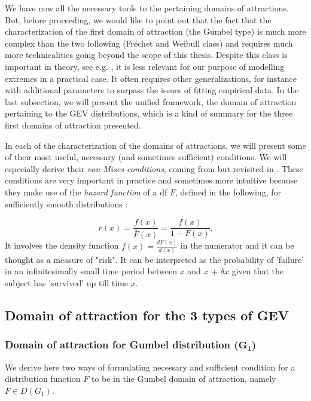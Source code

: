 \documentclass[11pt,a4paper,openany ]{book}
\begin{document}
We have now all the necessary tools to  the pertaining domains of attractions. But, before proceeding, we would like to point out that the fact that the characterization of the first domain of attraction (the Gumbel type)  is much more complex than the two following (Fréchet and Weibull class) and requires much more technicalities going beyond the scope of this thesis. Despite this class is important in theory, see e.g. \cite{pinheiro_comparative_2015}, it is less relevant for our purpose of modelling extremes in a practical case. It often requires other generalizations, for instance with additional parameters to surpass the issues of fitting empirical data. In the last subsection, we will present the unified framework, the domain of attraction pertaining to the GEV distributions, which is a kind of summary for the three first domains of attraction presented.


In each of the characterization of the domains of attractions, we will present some of their most useful, necessary (and sometimes sufficient) conditions. We will especially derive their \emph{von Mises conditions}, coming from \cite{von_mises_distribution_1936} but revisited in \cite{falk_von_1993}. These conditions are very important in practice and sometimes more intuitive because they make use of the \emph{hazard function} of a df $F$, defined in the following, for sufficiently smooth distributions :

\begin{equation}\label{haz}
r(x)=\frac{f(x)}{\bar{F}(x)}= \frac{f(x)}{1-F(x)}.
\end{equation}
It involves the density function $f(x)=\frac{dF(x)}{d(x)}$ in the numerator and it can be thought as a measure of "risk". It can be interpreted as the probability of 'failure' in an infinitesimally small time period between $x$ and $x$ + $\delta x$ given
that the subject has 'survived' up till time $x$.

\subsection{Domain of attraction for the 3 types of GEV}


\subsubsection*{Domain of attraction for Gumbel distribution ($\mathbf{G_1}$) }  We derive here two ways of formulating necessary and sufficient condition for a distribution function $F$ to be in the Gumbel domain of attraction, namely $F\in D(G_1)$.
\end{document}

